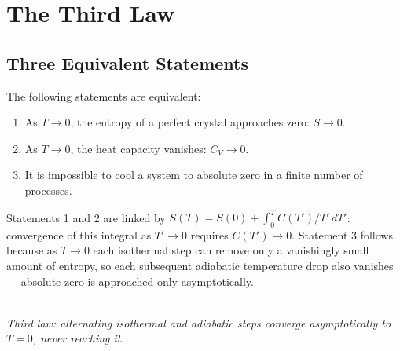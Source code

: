 \section{The Third Law}

\subsection{Three Equivalent Statements}

\begin{theorem}
The following statements are equivalent:
\begin{enumerate}
    \item As $T \to 0$, the entropy of a perfect crystal approaches zero: $S \to 0$.
    \item As $T \to 0$, the heat capacity vanishes: $C_V \to 0$.
    \item It is impossible to cool a system to absolute zero in a finite number of processes.
\end{enumerate}
\end{theorem}

Statements 1 and 2 are linked by $S(T) = S(0) + \int_0^T C(T')/T'\,dT'$: convergence of this integral as $T' \to 0$ requires $C(T') \to 0$. Statement 3 follows because as $T \to 0$ each isothermal step can remove only a vanishingly small amount of entropy, so each subsequent adiabatic temperature drop also vanishes --- absolute zero is approached only asymptotically.

\begin{center}
\\[3pt]
{\small\itshape Third law: alternating isothermal and adiabatic steps converge asymptotically to $T=0$, never reaching it.}
\end{center}

